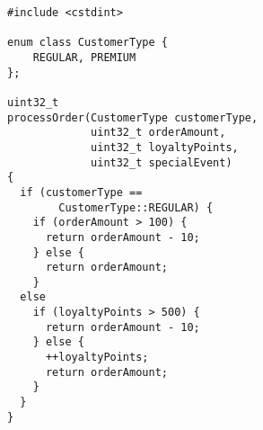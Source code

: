 \begin{minipage}{0.50\textwidth}
    \begin{lstlisting}[style=CStyle]
#include <cstdint>

enum class CustomerType { 
    REGULAR, PREMIUM 
};

uint32_t 
processOrder(CustomerType customerType,
             uint32_t orderAmount,
             uint32_t loyaltyPoints,
             uint32_t specialEvent) 
{
  if (customerType == 
        CustomerType::REGULAR) {
    if (orderAmount > 100) {
      return orderAmount - 10;
    } else {
      return orderAmount;
    }
  else
    if (loyaltyPoints > 500) {
      return orderAmount - 10;
    } else {
      ++loyaltyPoints;
      return orderAmount;
    }
  }
}
    \end{lstlisting}
\end{minipage}%
\hspace{-1cm} %
\begin{minipage}{0.40\textwidth}
\end{minipage}